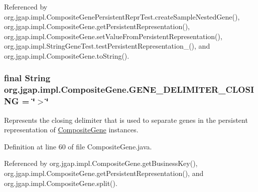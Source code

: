 Referenced by org.\-jgap.\-impl.\-Composite\-Gene\-Persistent\-Repr\-Test.\-create\-Sample\-Nested\-Gene(), org.\-jgap.\-impl.\-Composite\-Gene.\-get\-Persistent\-Representation(), org.\-jgap.\-impl.\-Composite\-Gene.\-set\-Value\-From\-Persistent\-Representation(), org.\-jgap.\-impl.\-String\-Gene\-Test.\-test\-Persistent\-Representation\-\_(), and org.\-jgap.\-impl.\-Composite\-Gene.\-to\-String().

\hypertarget{classorg_1_1jgap_1_1impl_1_1_composite_gene_ab95ce27b4f68e0d22791bb4d82d6c0d5}{
\subsubsection[{G\-E\-N\-E\-\_\-\-D\-E\-L\-I\-M\-I\-T\-E\-R\-\_\-\-C\-L\-O\-S\-I\-N\-G}]{\setlength{\rightskip}{0pt plus 5cm}final String org.\-jgap.\-impl.\-Composite\-Gene.\-G\-E\-N\-E\-\_\-\-D\-E\-L\-I\-M\-I\-T\-E\-R\-\_\-\-C\-L\-O\-S\-I\-N\-G = \char`\"{}$>$\char`\"{}\hspace{0.3cm}{\ttfamily [static]}}}\label{classorg_1_1jgap_1_1impl_1_1_composite_gene_ab95ce27b4f68e0d22791bb4d82d6c0d5}
Represents the closing delimiter that is used to separate genes in the persistent representation of \hyperlink{classorg_1_1jgap_1_1impl_1_1_composite_gene}{Composite\-Gene} instances. 

Definition at line 60 of file Composite\-Gene.\-java.



Referenced by org.\-jgap.\-impl.\-Composite\-Gene.\-get\-Business\-Key(), org.\-jgap.\-impl.\-Composite\-Gene.\-get\-Persistent\-Representation(), and org.\-jgap.\-impl.\-Composite\-Gene.\-split().

